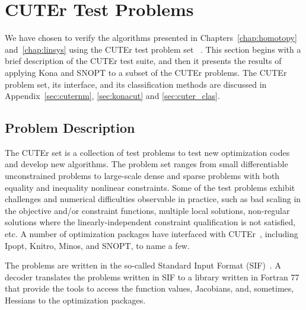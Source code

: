 \section{CUTEr Test Problems}\label{sec:cuter1}
We have chosen to verify the algorithms presented in Chapters~\ref{chap:homotopy} and~\ref{chap:linsys}  using the CUTEr test problem set ~\cite{cuter_opt, cuter_gould}. This section begins with a brief description of the CUTEr test suite, and then it presents the results of applying Kona and SNOPT to a subset of the CUTEr problems.
The CUTEr problem set, its interface, and its classification methods are discussed in Appendix~\ref{sec:cuternm}, \ref{sec:konacut} and \ref{sec:cuter_clas}.  

\subsection{Problem Description}
The CUTEr set is a collection of 
test problems to test new optimization codes and develop new algorithms. The problem set ranges from small differentiable unconstrained problems to large-scale dense and sparse problems with both equality and inequality nonlinear constraints.
Some of the test problems exhibit challenges and numerical difficulties observable in practice, such as bad scaling in the objective and/or constraint functions, multiple local solutions, non-regular solutions where the linearly-independent constraint qualification is not satisfied, etc. A number of optimization packages have interfaced with CUTEr~\cite{cuter_interface}, including Ipopt, Knitro, Minos, and SNOPT, to name a few.

The problems are written in the so-called Standard Input Format (SIF)~\cite{Conn1992}. A decoder translates the problems written in SIF to a library written in Fortran 77 that provide the tools to access the function values, Jacobians, and, sometimes, Hessians to the optimization packages. %

